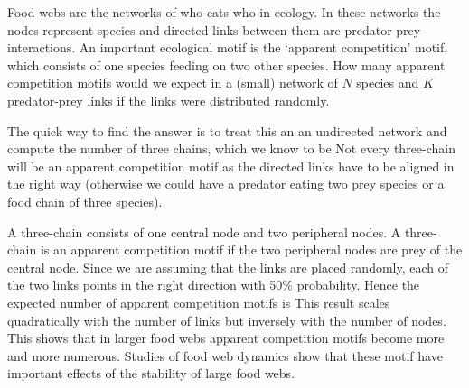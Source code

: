 
Food webs are the networks of who-eats-who in ecology. In these networks the nodes represent species and directed links between them are predator-prey interactions. An important ecological motif is the `apparent competition' motif, which consists of one species feeding on two other species. How many apparent competition motifs would we expect in a (small) network of $N$ species and $K$ predator-prey links if the links were distributed randomly. 

\solution

The quick way to find the answer is to treat this an an undirected network and compute the number of three chains, which we know to be 
Not every three-chain will be an apparent competition motif as the directed links have to be aligned in the right way (otherwise we could have a predator eating two prey species or a food chain of three species). 

A three-chain consists of one central node and two peripheral nodes. A three-chain is an apparent competition motif if the two peripheral nodes are prey of the central node. Since we are assuming that the links are placed randomly, each of the two links points in the right direction with 50\% probability. Hence the expected number of apparent competition motifs is 
This result scales quadratically with the number of links but inversely with the number of nodes. This shows that in larger food webs apparent competition motifs become more and more numerous. Studies of food web dynamics show that these motif have important effects of the stability of large food webs. 
